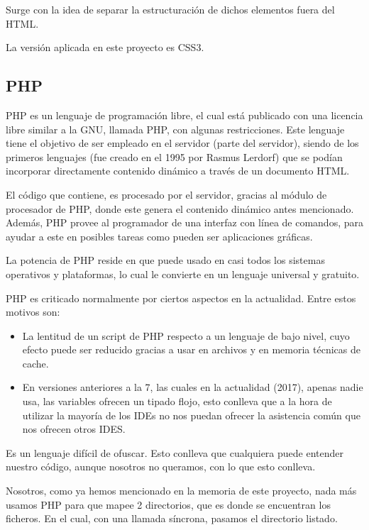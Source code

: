 Surge con la idea de separar la estructuración de dichos elementos fuera del HTML.

La versión aplicada en este proyecto es CSS3.

\subsection{PHP}

PHP es un lenguaje de programación libre, el cual está publicado con una licencia libre similar a la GNU, llamada PHP, con algunas restricciones.  Este lenguaje tiene el objetivo de ser empleado en el servidor (parte del servidor), siendo de los primeros lenguajes (fue creado en el 1995 por Rasmus Lerdorf) que se podían incorporar directamente contenido dinámico a través de un documento HTML.\cite{PHP5.5}

El código que contiene, es procesado por el servidor, gracias al módulo de procesador de PHP, donde este genera el contenido dinámico antes mencionado.
Además, PHP provee al programador de una interfaz con línea de comandos, para ayudar a este en posibles tareas como pueden ser aplicaciones gráficas.


La potencia de PHP reside en que puede usado en casi todos los sistemas operativos y plataformas, lo cual le convierte en un lenguaje universal y gratuito.

PHP es criticado normalmente por ciertos aspectos en la actualidad. Entre estos motivos son:
\begin{itemize}
	\item La lentitud de un script de PHP respecto a un lenguaje de bajo nivel, cuyo efecto puede ser reducido gracias a usar en archivos y en memoria técnicas de cache.
	\item En versiones anteriores a la 7, las cuales en la actualidad (2017), apenas nadie usa, las variables ofrecen un tipado flojo, esto conlleva que a la hora de utilizar la mayoría de los IDEs no nos puedan ofrecer la asistencia común que nos ofrecen otros IDES.

\end{itemize}
Es un lenguaje difícil de ofuscar. Esto conlleva que cualquiera puede entender nuestro código, aunque nosotros no queramos, con lo que esto conlleva.

Nosotros, como ya hemos mencionado en la memoria de este proyecto, nada más usamos PHP para que mapee 2 directorios, que es donde se encuentran los ficheros. En el cual, con una llamada síncrona, pasamos el directorio listado.

